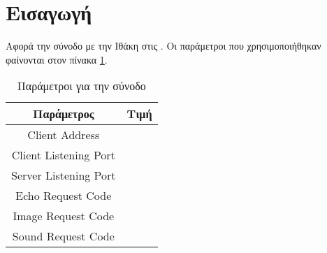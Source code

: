 \section{Εισαγωγή}
Αφορά την \sessionnumber{} σύνοδο με την Ιθάκη στις \sessiondatestart{}.
Οι παράμετροι που χρησιμοποιήθηκαν φαίνονται στον πίνακα
\hyperref[table:codes]{\ref{table:codes}}.

\begin{table}
\centering
\begin{tabular}{c|c}
\hline
\multicolumn{1}{c}{\bfseries Παράμετρος} & \multicolumn{1}{|c}{\bfseries Τιμή}\\\hline
Client Address&\clientaddress{}\\
Client Listening Port&\clientlisteningport{}\\
Server Listening Port&\serverlisteningport{}\\
Echo Request Code&\echorequestcode{}\\
Image Request Code&\imagerequestcode{}\\
Sound Request Code&\soundrequestcode{}\\
\end{tabular}
\caption{Παράμετροι για την \sessionnumber{} σύνοδο}
\label{table:codes}
\end{table}
\FloatBarrier
